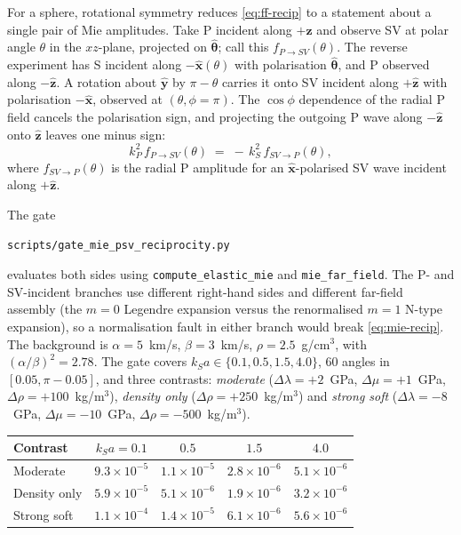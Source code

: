 \documentclass[11pt,a4paper]{article}
\newcommand{\xhat}{\hat{\mathbf{x}}}
\begin{document}
For a sphere, rotational symmetry reduces \eqref{eq:ff-recip} to a
statement about a single pair of Mie amplitudes. Take P incident along
$+\hat{\mathbf{z}}$ and observe SV at polar angle $\theta$ in the
$xz$-plane, projected on $\hat{\boldsymbol{\theta}}$; call this
$f_{P\to SV}(\theta)$. The reverse experiment has S incident along
$-\xhat(\theta)$ with polarisation $\hat{\boldsymbol{\theta}}$, and P observed
along $-\hat{\mathbf{z}}$. A rotation about $\hat{\mathbf{y}}$ by
$\pi-\theta$ carries it onto SV incident along $+\hat{\mathbf{z}}$ with
polarisation $-\hat{\mathbf{x}}$, observed at $(\theta, \phi=\pi)$. The
$\cos\phi$ dependence of the radial P field cancels the polarisation
sign, and projecting the outgoing P wave along $-\hat{\mathbf{z}}$ onto
$\hat{\mathbf{z}}$ leaves one minus sign:
\begin{equation}
  k_P^{2}\, f_{P\to SV}(\theta) \;=\; -\,k_S^{2}\, f_{SV\to P}(\theta),
  \label{eq:mie-recip}
\end{equation}
where $f_{SV\to P}(\theta)$ is the radial P amplitude for an
$\hat{\mathbf{x}}$-polarised SV wave incident along $+\hat{\mathbf{z}}$.

The gate
\begin{center}
\texttt{scripts/gate\_mie\_psv\_reciprocity.py}
\end{center}
evaluates both sides using \texttt{compute\_elastic\_mie} and
\texttt{mie\_far\_field}.
The P- and SV-incident branches use different right-hand sides and
different far-field assembly (the $m=0$ Legendre expansion versus the
renormalised $m=1$ N-type expansion), so a normalisation fault in either
branch would break \eqref{eq:mie-recip}. The background is
$\alpha = 5$~km/s, $\beta = 3$~km/s, $\rho = 2.5$~g/cm$^3$, with
$(\alpha/\beta)^2 = 2.78$. The gate covers $k_S a \in \{0.1, 0.5, 1.5,
4.0\}$, 60 angles in $[0.05, \pi-0.05]$, and three contrasts:
\emph{moderate} ($\Delta\lambda = +2$~GPa, $\Delta\mu = +1$~GPa,
$\Delta\rho = +100$~kg/m$^3$), \emph{density only}
($\Delta\rho = +250$~kg/m$^3$) and \emph{strong soft}
($\Delta\lambda = -8$~GPa, $\Delta\mu = -10$~GPa,
$\Delta\rho = -500$~kg/m$^3$).

\begin{center}
\begin{tabular}{lcccc}
\toprule
Contrast & $k_S a = 0.1$ & $0.5$ & $1.5$ & $4.0$ \\
\midrule
Moderate     & $9.3\times10^{-5}$ & $1.1\times10^{-5}$ & $2.8\times10^{-6}$ & $5.1\times10^{-6}$ \\
Density only & $5.9\times10^{-5}$ & $5.1\times10^{-6}$ & $1.9\times10^{-6}$ & $3.2\times10^{-6}$ \\
Strong soft  & $1.1\times10^{-4}$ & $1.4\times10^{-5}$ & $6.1\times10^{-6}$ & $5.6\times10^{-6}$ \\
\bottomrule
\end{tabular}
\end{center}
\end{document}

